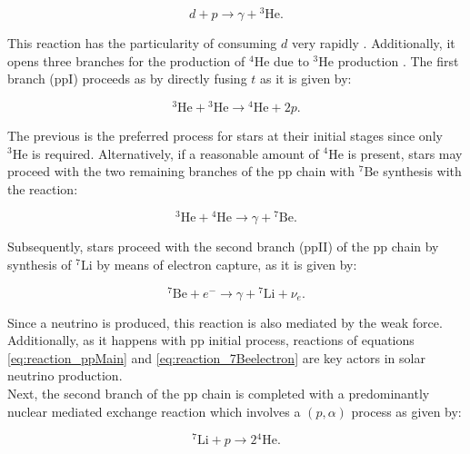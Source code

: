 \documentclass[openany]{book}
\begin{document}
\begin{equation} \label{eq:reaction_2Hpgamma3He}
	d + p  \rightarrow \gamma + {}^{3} \mathrm{He}.
\end{equation}

This reaction has the particularity of consuming $d$ very rapidly \cite{bertulani_2010}. Additionally, it opens three branches for the production of $\mathrm{{}^{4}He}$ due to ${}^{3} \mathrm{He}$ production \cite{fowler_1958}. The first branch (ppI) proceeds as by directly fusing $t$ as it is given by: 

\begin{equation} \label{eq:reaction_3Hep3He}
	 {}^{3} \mathrm{He} +  {}^{3} \mathrm{He} \rightarrow {}^{4}\mathrm{He} + 2p.
\end{equation}

The previous is the preferred process for stars at their initial stages since only $ {}^{3} \mathrm{He} $ is required. Alternatively, if a reasonable amount of ${}^{4}\mathrm{He}$ is present, stars may proceed with the two remaining branches of the pp chain with $\mathrm{{}^{7}Be}$ synthesis with the reaction: 

\begin{equation}  \label{eq:reaction_3He4He}
	{}^{3}\mathrm{He} +{}^{4}\mathrm{He} \rightarrow \gamma +  \mathrm{{}^{7}Be} .
\end{equation}

Subsequently, stars proceed with the second branch (ppII)  of the pp chain by synthesis of $\mathrm{{}^{7}Li}$ by means of electron capture, as it is given by:

\begin{equation}  \label{eq:reaction_7Beelectron}
	{}^{7}\mathrm{Be} + e^{-} \rightarrow \gamma +  \mathrm{{}^{7}Li} + \nu_e.
\end{equation}

Since a neutrino is produced, this reaction is also mediated by the weak force. Additionally, as it happens with pp initial process, reactions of equations \ref{eq:reaction_ppMain} and \ref{eq:reaction_7Beelectron} are key actors in solar neutrino production.  \\

Next, the second branch of the pp chain is completed with a predominantly nuclear mediated exchange reaction which involves a $(p, \alpha)$ process as given by: 

\begin{equation}  \label{eq:reaction_7Lialpha}
	{}^{7}\mathrm{Li} + p  \rightarrow 2\mathrm{{}^{4}He}.
\end{equation}
\end{document}
